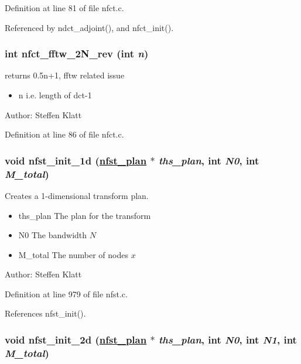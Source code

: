 Definition at line 81 of file nfct.c.

Referenced by ndct\_\-adjoint(), and nfct\_\-init().\hypertarget{group__nfsct_ga14}{
\subsubsection[nfct\_\-fftw\_\-2N\_\-rev]{\setlength{\rightskip}{0pt plus 5cm}int nfct\_\-fftw\_\-2N\_\-rev (int {\em n})}}
\label{group__nfsct_ga14}


returns 0.5n+1, fftw related issue 

\begin{itemize}
\item n i.e. length of dct-1\end{itemize}
\begin{Desc}
\item[Author:]Steffen Klatt \end{Desc}


Definition at line 86 of file nfct.c.\hypertarget{group__nfsct_ga15}{
\subsubsection[nfst\_\-init\_\-1d]{\setlength{\rightskip}{0pt plus 5cm}void nfst\_\-init\_\-1d (\hyperlink{structnfst__plan}{nfst\_\-plan} $\ast$ {\em ths\_\-plan}, int {\em N0}, int {\em M\_\-total})}}
\label{group__nfsct_ga15}


Creates a 1-dimensional transform plan. 

\begin{itemize}
\item ths\_\-plan The plan for the transform \item N0 The bandwidth $N$ \item M\_\-total The number of nodes $x$\end{itemize}
\begin{Desc}
\item[Author:]Steffen Klatt \end{Desc}


Definition at line 979 of file nfst.c.

References nfst\_\-init().\hypertarget{group__nfsct_ga16}{
\subsubsection[nfst\_\-init\_\-2d]{\setlength{\rightskip}{0pt plus 5cm}void nfst\_\-init\_\-2d (\hyperlink{structnfst__plan}{nfst\_\-plan} $\ast$ {\em ths\_\-plan}, int {\em N0}, int {\em N1}, int {\em M\_\-total})}}
\label{group__nfsct_ga16}


